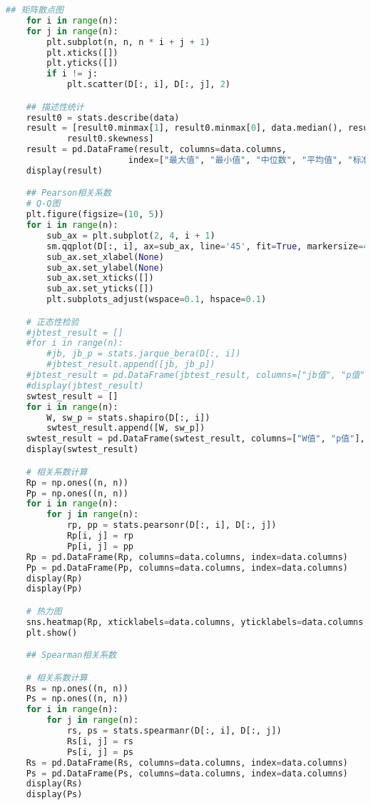 \documentclass[withoutpreface]{cumcmthesis}
\begin{document}
    \begin{lstlisting}[language=python ,caption={相关系数分析示例} ]
    ## 矩阵散点图
    for i in range(n):
    for j in range(n):
        plt.subplot(n, n, n * i + j + 1)
        plt.xticks([])
        plt.yticks([])
        if i != j:
            plt.scatter(D[:, i], D[:, j], 2)

    ## 描述性统计
    result0 = stats.describe(data)
    result = [result0.minmax[1], result0.minmax[0], data.median(), result0.mean, data.std(), result0.kurtosis,
            result0.skewness]
    result = pd.DataFrame(result, columns=data.columns,
                        index=["最大值", "最小值", "中位数", "平均值", "标准差", "峰度", "偏度"])
    display(result)

    ## Pearson相关系数
    # Q-Q图
    plt.figure(figsize=(10, 5))
    for i in range(n):
        sub_ax = plt.subplot(2, 4, i + 1)
        sm.qqplot(D[:, i], ax=sub_ax, line='45', fit=True, markersize=4, marker="x")
        sub_ax.set_xlabel(None)
        sub_ax.set_ylabel(None)
        sub_ax.set_xticks([])
        sub_ax.set_yticks([])
        plt.subplots_adjust(wspace=0.1, hspace=0.1)

    # 正态性检验
    #jbtest_result = []
    #for i in range(n):
        #jb, jb_p = stats.jarque_bera(D[:, i])
        #jbtest_result.append([jb, jb_p])
    #jbtest_result = pd.DataFrame(jbtest_result, columns=["jb值", "p值"], index=data.columns)
    #display(jbtest_result)
    swtest_result = []
    for i in range(n):
        W, sw_p = stats.shapiro(D[:, i])
        swtest_result.append([W, sw_p])
    swtest_result = pd.DataFrame(swtest_result, columns=["W值", "p值"], index=data.columns)
    display(swtest_result)

    # 相关系数计算
    Rp = np.ones((n, n))
    Pp = np.ones((n, n))
    for i in range(n):
        for j in range(n):
            rp, pp = stats.pearsonr(D[:, i], D[:, j])
            Rp[i, j] = rp
            Pp[i, j] = pp
    Rp = pd.DataFrame(Rp, columns=data.columns, index=data.columns)
    Pp = pd.DataFrame(Pp, columns=data.columns, index=data.columns)
    display(Rp)
    display(Pp)

    # 热力图
    sns.heatmap(Rp, xticklabels=data.columns, yticklabels=data.columns, annot=True, cmap="jet", fmt=".4f")
    plt.show()

    ## Spearman相关系数

    # 相关系数计算
    Rs = np.ones((n, n))
    Ps = np.ones((n, n))
    for i in range(n):
        for j in range(n):
            rs, ps = stats.spearmanr(D[:, i], D[:, j])
            Rs[i, j] = rs
            Ps[i, j] = ps
    Rs = pd.DataFrame(Rs, columns=data.columns, index=data.columns)
    Ps = pd.DataFrame(Ps, columns=data.columns, index=data.columns)
    display(Rs)
    display(Ps)


\end{lstlisting}
\end{document}
